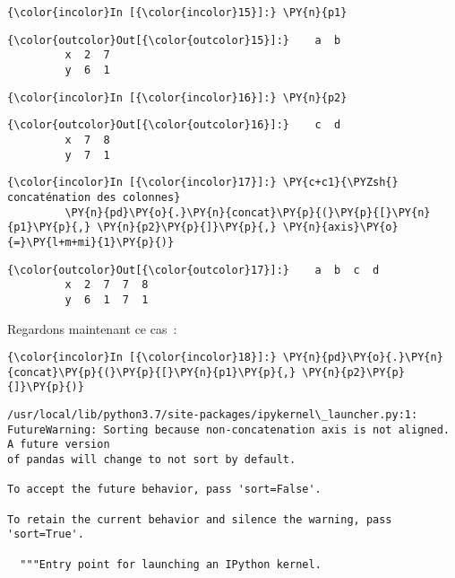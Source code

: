     \begin{Verbatim}[commandchars=\\\{\}]
{\color{incolor}In [{\color{incolor}15}]:} \PY{n}{p1}
\end{Verbatim}


\begin{Verbatim}[commandchars=\\\{\}]
{\color{outcolor}Out[{\color{outcolor}15}]:}    a  b
         x  2  7
         y  6  1
\end{Verbatim}
            
    \begin{Verbatim}[commandchars=\\\{\}]
{\color{incolor}In [{\color{incolor}16}]:} \PY{n}{p2}
\end{Verbatim}


\begin{Verbatim}[commandchars=\\\{\}]
{\color{outcolor}Out[{\color{outcolor}16}]:}    c  d
         x  7  8
         y  7  1
\end{Verbatim}
            
    \begin{Verbatim}[commandchars=\\\{\}]
{\color{incolor}In [{\color{incolor}17}]:} \PY{c+c1}{\PYZsh{} concaténation des colonnes}
         \PY{n}{pd}\PY{o}{.}\PY{n}{concat}\PY{p}{(}\PY{p}{[}\PY{n}{p1}\PY{p}{,} \PY{n}{p2}\PY{p}{]}\PY{p}{,} \PY{n}{axis}\PY{o}{=}\PY{l+m+mi}{1}\PY{p}{)}
\end{Verbatim}


\begin{Verbatim}[commandchars=\\\{\}]
{\color{outcolor}Out[{\color{outcolor}17}]:}    a  b  c  d
         x  2  7  7  8
         y  6  1  7  1
\end{Verbatim}
            
    Regardons maintenant ce cas~:

    \begin{Verbatim}[commandchars=\\\{\}]
{\color{incolor}In [{\color{incolor}18}]:} \PY{n}{pd}\PY{o}{.}\PY{n}{concat}\PY{p}{(}\PY{p}{[}\PY{n}{p1}\PY{p}{,} \PY{n}{p2}\PY{p}{]}\PY{p}{)}
\end{Verbatim}


    \begin{Verbatim}[commandchars=\\\{\}]
/usr/local/lib/python3.7/site-packages/ipykernel\_launcher.py:1: FutureWarning: Sorting because non-concatenation axis is not aligned. A future version
of pandas will change to not sort by default.

To accept the future behavior, pass 'sort=False'.

To retain the current behavior and silence the warning, pass 'sort=True'.

  """Entry point for launching an IPython kernel.

    \end{Verbatim}

